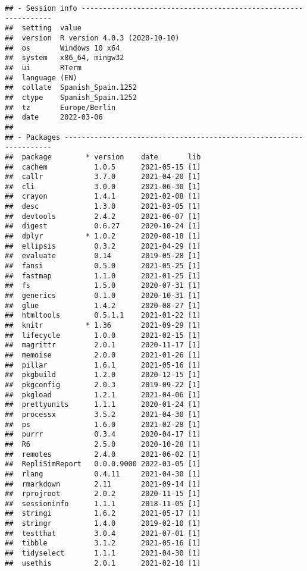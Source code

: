 \documentclass[10,a4paperpaper,]{article}
\begin{document}
\begin{verbatim}
## - Session info ---------------------------------------------------------------
##  setting  value                       
##  version  R version 4.0.3 (2020-10-10)
##  os       Windows 10 x64              
##  system   x86_64, mingw32             
##  ui       RTerm                       
##  language (EN)                        
##  collate  Spanish_Spain.1252          
##  ctype    Spanish_Spain.1252          
##  tz       Europe/Berlin               
##  date     2022-03-06                  
## 
## - Packages -------------------------------------------------------------------
##  package        * version    date       lib
##  cachem           1.0.5      2021-05-15 [1]
##  callr            3.7.0      2021-04-20 [1]
##  cli              3.0.0      2021-06-30 [1]
##  crayon           1.4.1      2021-02-08 [1]
##  desc             1.3.0      2021-03-05 [1]
##  devtools         2.4.2      2021-06-07 [1]
##  digest           0.6.27     2020-10-24 [1]
##  dplyr          * 1.0.2      2020-08-18 [1]
##  ellipsis         0.3.2      2021-04-29 [1]
##  evaluate         0.14       2019-05-28 [1]
##  fansi            0.5.0      2021-05-25 [1]
##  fastmap          1.1.0      2021-01-25 [1]
##  fs               1.5.0      2020-07-31 [1]
##  generics         0.1.0      2020-10-31 [1]
##  glue             1.4.2      2020-08-27 [1]
##  htmltools        0.5.1.1    2021-01-22 [1]
##  knitr          * 1.36       2021-09-29 [1]
##  lifecycle        1.0.0      2021-02-15 [1]
##  magrittr         2.0.1      2020-11-17 [1]
##  memoise          2.0.0      2021-01-26 [1]
##  pillar           1.6.1      2021-05-16 [1]
##  pkgbuild         1.2.0      2020-12-15 [1]
##  pkgconfig        2.0.3      2019-09-22 [1]
##  pkgload          1.2.1      2021-04-06 [1]
##  prettyunits      1.1.1      2020-01-24 [1]
##  processx         3.5.2      2021-04-30 [1]
##  ps               1.6.0      2021-02-28 [1]
##  purrr            0.3.4      2020-04-17 [1]
##  R6               2.5.0      2020-10-28 [1]
##  remotes          2.4.0      2021-06-02 [1]
##  RepliSimReport   0.0.0.9000 2022-03-05 [1]
##  rlang            0.4.11     2021-04-30 [1]
##  rmarkdown        2.11       2021-09-14 [1]
##  rprojroot        2.0.2      2020-11-15 [1]
##  sessioninfo      1.1.1      2018-11-05 [1]
##  stringi          1.6.2      2021-05-17 [1]
##  stringr          1.4.0      2019-02-10 [1]
##  testthat         3.0.4      2021-07-01 [1]
##  tibble           3.1.2      2021-05-16 [1]
##  tidyselect       1.1.1      2021-04-30 [1]
##  usethis          2.0.1      2021-02-10 [1]

\end{verbatim}
\end{document}
